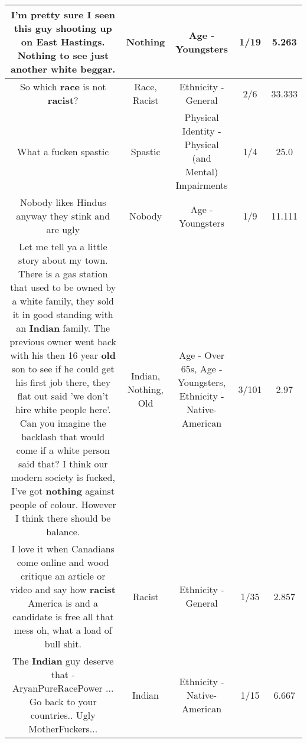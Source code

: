 \documentclass[11pt]{article}
\newlength\mylength
\begin{document}
\begin{center}
\begin{longtable}{|C{.65\mylength}|C{.30\mylength}|C{.12\mylength}|C{.12\mylength}|C{.12\mylength}|}
  \small I'm pretty sure I seen this guy shooting up on East Hastings. \textbf{Nothing} to see just another white beggar.\normalsize   & Nothing & Age - Youngsters & 1/19 & 5.263 \\  \hline
  \small So which \textbf{race} is not \textbf{racist}?\normalsize   & Race, Racist & Ethnicity - General & 2/6 & 33.333 \\  \hline
  \small What a fucken spastic\normalsize   & Spastic & Physical Identity - Physical (and Mental) Impairments & 1/4 & 25.0 \\  \hline
  \small Nobody likes Hindus anyway they stink and are ugly\normalsize   & Nobody & Age - Youngsters & 1/9 & 11.111 \\  \hline
  \small Let me tell ya a little story about my town. There is a gas station that used to be owned by a white family, they sold it in good standing with an \textbf{Indian} family. The previous owner went back with his then 16 year \textbf{old} son to see if he could get his first job there, they flat out said 'we don't hire white people here'. Can you imagine the backlash that would come if a white person said that? I think our modern society is fucked, I've got \textbf{nothing} against people of colour. However I think there should be balance.\normalsize   & Indian, Nothing, Old & Age - Over 65s, Age - Youngsters, Ethnicity - Native-American & 3/101 & 2.97 \\  \hline
  \small I love it when Canadians  come online and wood critique an article or video and say how \textbf{racist} America is  and a candidate is free all that mess oh, what a load of bull shit.\normalsize   & Racist & Ethnicity - General & 1/35 & 2.857 \\  \hline
  \small The \textbf{Indian} guy deserve that - AryanPureRacePower ... Go back to your countries.. Ugly MotherFuckers...\normalsize   & Indian & Ethnicity - Native-American & 1/15 & 6.667 \\  \hline

\end{longtable}
\end{center}
\end{document}
